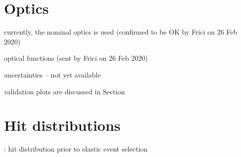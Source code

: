 \chapter[optics]{Optics}

\> currently, the nominal optics is used (confirmed to be OK by Frici on 26 Feb 2020)

\> optical functions (sent by Frici on 26 Feb 2020)

\centerline{\vbox{}}

\> uncertainties -- not yet available
\iffalse
\>> 3 leading eigen modes reproduce the matrix sufficiently well
\>> propagated to relative uncertainties of scattering angles by program "reconstruction\_formulae/print\_optics\_uncertainties"
\>>> left-arm reconstruction: $\si(\de\th^*_x) = 0.00173$, $\si(\de\th^*_y) = 0.00152$
\>>> right-arm reconstruction: $\si(\de\th^*_x) = 0.00175$, $\si(\de\th^*_y) = 0.00152$
\>>> double-arm reconstruction: $\si(\de\th^*_x) = 0.00165$, $\si(\de\th^*_y) = 0.00152$, correlation factor $-90.29\un{\%}$

\>> single-arm perturbations decomposed to modes (program "systematics/optics\_scaling\_matrix")
\>>> relative errors, order: $\th^*_{x,L}$, $\th^*_{y,L}$, $\th^*_{x,R}$, $\th^*_{y,R}$
\>>> mode 1: -1.608E-03, +1.473E-03, -1.630E-03, +1.477E-03
\>>> mode 2: -5.157E-04, +2.541E-05, +5.566E-04, +2.746E-05
\>>> mode 3: +3.617E-04, +3.625E-04, +3.006E-04, +3.641E-04
\fi


\> validation plots are discussed in Section 



\chapter[hit-dist]{Hit distributions}

\> : hit distribution prior to elastic event selection

